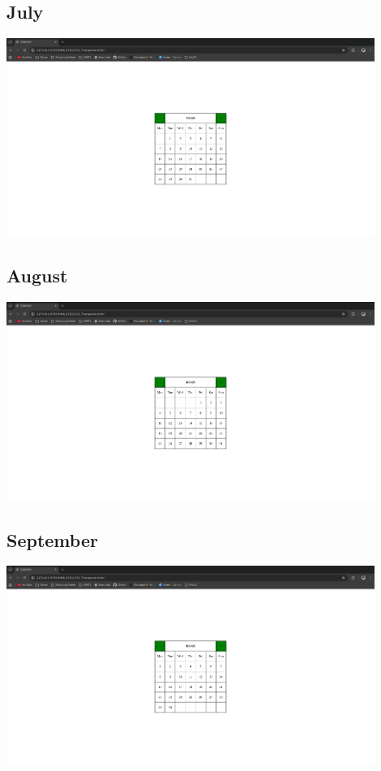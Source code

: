 \documentclass[12pt]{report} %
\begin{document}
\subsection*{July}
\includegraphics[width=12cm]{./images/Output07.png} \\
\subsection*{August}
\includegraphics[width=12cm]{./images/Output08.png} \\
\subsection*{September}
\includegraphics[width=12cm]{./images/Output09.png} \\
\end{document}
